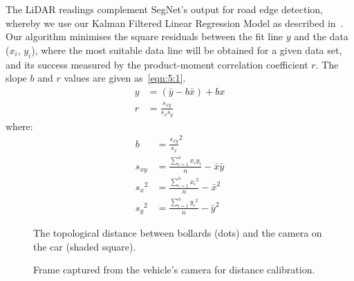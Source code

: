 The LiDAR readings complement SegNet's output for road edge detection, whereby we use our Kalman Filtered Linear Regression Model as described in~\cite{drage_lidar_2015}. Our algorithm minimises the square residuals between the fit line $y$ and the data ($x_i$, $y_i$), where the most suitable data line will be obtained for a given data set, and its success measured by the product-moment correlation coefficient $r$. The slope $b$ and $r$ values are given as~\eqref{eqn:5:1}.
\begin{subequations}
	\label{eqn:5:1}
	\begin{align}
		y &= (\bar{y}-b\bar{x})+bx \\
		r &= \frac{s_{xy}}{s_x s_y}%
	\end{align}
\end{subequations}
where:
\begin{subequations}
	\label{eqn:5:2}
	\begin{align}
	b &= \frac{s_{xy}}{s_x}^2\\
	s_{xy} &= \frac{\sum_{i=1}^{n} x_i y_i}{n}-\bar{x}\bar{y} \\
	{s_x}^2 &= \frac{\sum_{i=1}^{n} {x_i}^2}{n}-\bar{x}^2 \\
	{s_y}^2 &= \frac{\sum_{i=1}^{n} {y_i}^2}{n}-\bar{y}^2
	\end{align}
\end{subequations}


\begin{figure}[H]
	\centering
	\def\svgwidth{0.4\linewidth}
	
	\caption[Topological distance between bollards and car camera]{The topological distance between bollards (dots) and the camera on the car (shaded square).}
	\label{fig:5:distances}
\end{figure}

\begin{figure}[H]
	\centering
	\def\svgwidth{0.6\linewidth}
	
	\caption{Frame captured from the vehicle's camera for distance calibration.}
	\label{fig:5:bollards}
\end{figure}

